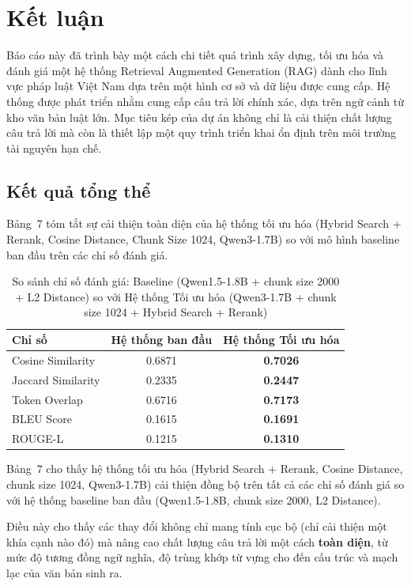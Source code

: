 \section{Kết luận}

Báo cáo này đã trình bày một cách chi tiết quá trình xây dựng, tối ưu hóa và đánh giá một
hệ thống Retrieval Augmented Generation (RAG) dành cho lĩnh vực pháp luật Việt Nam dựa
trên một hình cơ sở và dữ liệu được cung cấp. Hệ thống được phát triển nhằm cung cấp câu trả
lời chính xác, dựa trên ngữ cảnh từ kho văn bản luật lớn. Mục tiêu kép của dự án không chỉ là
cải thiện chất lượng câu trả lời mà còn là thiết lập một quy trình triển khai ổn định trên môi
trường tài nguyên hạn chế.

\subsection{Kết quả tổng thể}

Bảng~7 tóm tắt sự cải thiện toàn diện của hệ thống tối ưu hóa (Hybrid Search + Rerank, Cosine
Distance, Chunk Size 1024, Qwen3-1.7B) so với mô hình baseline ban đầu trên các chỉ số đánh
giá.

\begin{table}[h!]
\centering
\caption{So sánh chỉ số đánh giá: Baseline (Qwen1.5-1.8B + chunk size 2000 + L2 Distance) so
với Hệ thống Tối ưu hóa (Qwen3-1.7B + chunk size 1024 + Hybrid Search + Rerank)}
\begin{tabular}{|l|c|c|}
\hline
\textbf{Chỉ số} & \textbf{Hệ thống ban đầu} & \textbf{Hệ thống Tối ưu hóa} \\
\hline
Cosine Similarity   & 0.6871 & \textbf{0.7026} \\
Jaccard Similarity  & 0.2335 & \textbf{0.2447} \\
Token Overlap       & 0.6716 & \textbf{0.7173} \\
BLEU Score          & 0.1615 & \textbf{0.1691} \\
ROUGE-L             & 0.1215 & \textbf{0.1310} \\
\hline
\end{tabular}
\end{table}

Bảng~7 cho thấy hệ thống tối ưu hóa (Hybrid Search + Rerank, Cosine Distance, chunk size
1024, Qwen3-1.7B) cải thiện đồng bộ trên tất cả các chỉ số đánh giá so với hệ thống baseline
ban đầu (Qwen1.5-1.8B, chunk size 2000, L2 Distance).

Điều này cho thấy các thay đổi không chỉ mang tính cục bộ (chỉ cải thiện một khía cạnh nào
đó) mà nâng cao chất lượng câu trả lời một cách \textbf{toàn diện}, từ mức độ tương đồng ngữ nghĩa,
độ trùng khớp từ vựng cho đến cấu trúc và mạch lạc của văn bản sinh ra.

